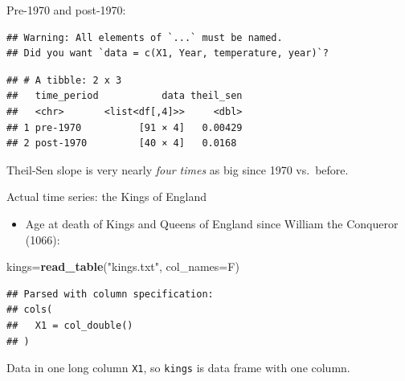 \documentclass[ignorenonframetext,]{beamer}
\newenvironment{Shaded}{\begin{snugshade}}{\end{snugshade}}
\newcommand{\DataTypeTok}[1]{\textcolor[rgb]{0.13,0.29,0.53}{#1}}
\newcommand{\DecValTok}[1]{\textcolor[rgb]{0.00,0.00,0.81}{#1}}
\newcommand{\KeywordTok}[1]{\textcolor[rgb]{0.13,0.29,0.53}{\textbf{#1}}}
\newcommand{\NormalTok}[1]{#1}
\newcommand{\OperatorTok}[1]{\textcolor[rgb]{0.81,0.36,0.00}{\textbf{#1}}}
\newcommand{\StringTok}[1]{\textcolor[rgb]{0.31,0.60,0.02}{#1}}
\providecommand{\tightlist}{%
  \setlength{\itemsep}{0pt}\setlength{\parskip}{0pt}}
\begin{document}
\begin{frame}[fragile]{Pre-1970 and post-1970:}
\protect\hypertarget{pre-1970-and-post-1970}{}

\begin{Shaded}
\end{Shaded}

\begin{verbatim}
## Warning: All elements of `...` must be named.
## Did you want `data = c(X1, Year, temperature, year)`?
\end{verbatim}

\begin{verbatim}
## # A tibble: 2 x 3
##   time_period           data theil_sen
##   <chr>       <list<df[,4]>>     <dbl>
## 1 pre-1970          [91 × 4]   0.00429
## 2 post-1970         [40 × 4]   0.0168
\end{verbatim}

Theil-Sen slope is very nearly \emph{four times} as big since 1970
vs.~before.

\end{frame}

\begin{frame}[fragile]{Actual time series: the Kings of England}
\protect\hypertarget{actual-time-series-the-kings-of-england}{}

\begin{itemize}
\tightlist
\item
  Age at death of Kings and Queens of England since William the
  Conqueror (1066):
\end{itemize}

\begin{Shaded}
\begin{Highlighting}[]
\NormalTok{kings=}\KeywordTok{read_table}\NormalTok{(}\StringTok{"kings.txt"}\NormalTok{, }\DataTypeTok{col_names=}\NormalTok{F)}
\end{Highlighting}
\end{Shaded}

\begin{verbatim}
## Parsed with column specification:
## cols(
##   X1 = col_double()
## )
\end{verbatim}

Data in one long column \texttt{X1}, so \texttt{kings} is data frame
with one column.

\end{frame}
\end{document}
